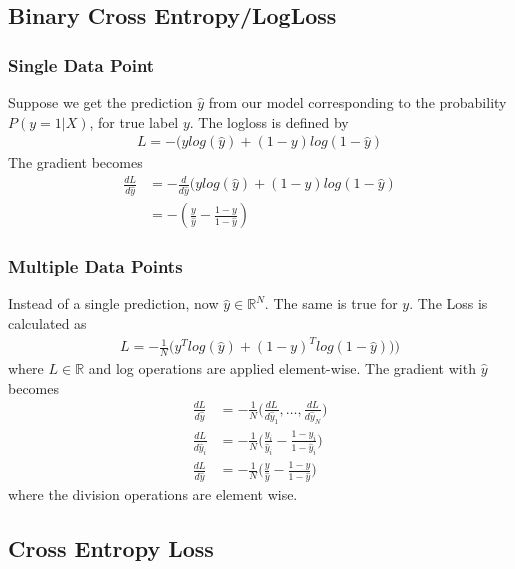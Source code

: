 \documentclass[../../deep_learning_notes.tex]{subfiles}
\begin{document}
\subsection{Binary Cross Entropy/LogLoss}
\subsubsection*{Single Data Point}
Suppose we get the prediction $\hat{y}$ from our model corresponding to the probability $P(y=1|X)$, for true label $y$. The logloss is defined by
\begin{align*}
    L = -(ylog(\hat{y}) + (1-y)log(1-\hat{y})
\end{align*}
The gradient becomes
\begin{align*}
    \frac{dL}{d\hat{y}} &= -\frac{d}{d\hat{y}} (ylog(\hat{y}) + (1-y)log(1-\hat{y})\\
    &= -(\frac{y}{\hat{y}} - \frac{1-y}{1 - \hat{y}})
\end{align*}


\subsubsection*{Multiple Data Points}
Instead of a single prediction, now $\hat{y} \in \mathbb{R}^{N}$. The same is true for $y$. The Loss is calculated as
\begin{align*}
    L = -\frac{1}{N} \big( y^{T}log(\hat{y}) + (1-y)^{T}log(1-\hat{y})) \big)
\end{align*}
where $L \in \mathbb{R}$ and log operations are applied element-wise. The gradient with $\hat{y}$ becomes
\begin{align*}
    \frac{dL}{d\hat{y}} &= -\frac{1}{N}\big( \frac{dL}{d\hat{y}_{1}}, \ldots, \frac{dL}{d\hat{y}_{N}} \big)\\
    \frac{dL}{d\hat{y}_{i}} &= -\frac{1}{N} \bigg( \frac{y_{i}}{\hat{y}_{i}} - \frac{1-y_{i}}{1-\hat{y}_{i}} \bigg)\\
    \frac{dL}{d\hat{y}} &= -\frac{1}{N} \big( \frac{y}{\hat{y}} - \frac{1-y}{1-\hat{y}} \big)
\end{align*}
where the division operations are element wise.


\subsection{Cross Entropy Loss}
\end{document}

